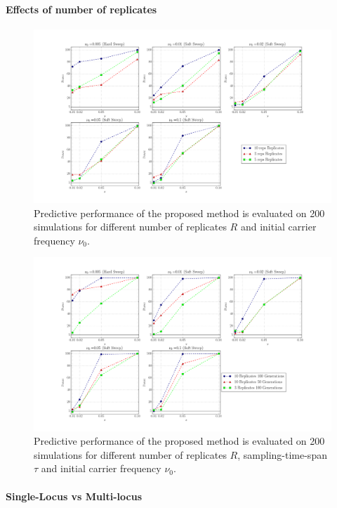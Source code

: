 \documentclass[11pt]{article}
\begin{document}
\paragraph{Effects of number of replicates}
\begin{figure}
	\centering
\includegraphics[trim=2.2in 0 2.2in 0, clip,width=\textwidth]{powerReplicate}
\caption{Predictive performance of the proposed method is evaluated on 200 
simulations for different number of replicates $R$ and initial carrier 
frequency $\nu_0$.} \label{fig:powerr}
\end{figure}
\begin{figure}
	\centering
\includegraphics[trim=2.2in 0 2.2in 0, 
clip,width=\textwidth]{powerReplicateTime}
	\caption{Predictive performance of the proposed method is evaluated on 200 
			simulations for different number of replicates $R$, 
			sampling-time-span $\tau$ and initial carrier 
			frequency $\nu_0$.} \label{fig:powerrt}
\end{figure}
\paragraph{Single-Locus vs Multi-locus}
\end{document}
